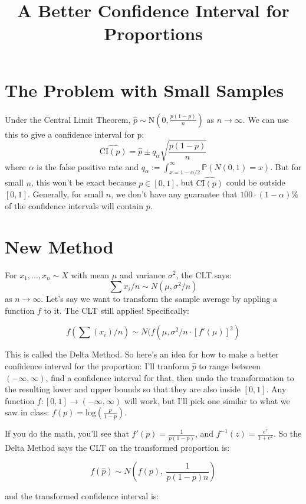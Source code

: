 \documentclass{article}
\title{A Better Confidence Interval for Proportions}
\author{}
\date{}
\begin{document}
\maketitle 

\section*{The Problem with Small Samples}

Under the Central Limit Theorem, $\hat{p} \sim \text{N}(0, \frac{p(1-p)}{n})$ as $n\rightarrow\infty$. We can use this to give a confidence interval for p: $$\widehat{\text{CI}(p)}=\hat{p} \pm q_\alpha\sqrt{\frac{p(1-p)}{n}}$$ where $\alpha$ is the false positive rate and $q_\alpha:=\int_{x=1-\alpha/2}^\infty \mathbb{P}(N(0, 1) = x)$. But for small $n$, this won't be exact because $p\in [0, 1]$, but $\widehat{\text{CI}(p)}$ could be outside $[0, 1]$. Generally, for small $n$, we don't have any guarantee that $100\cdot(1-\alpha)\%$ of the confidence intervals will contain $p$.

\section*{New Method}

For $x_1, ..., x_n \sim X$ with mean $\mu$ and variance $\sigma^2$, the CLT says: $$\sum x_i/n \sim N(\mu, \sigma^2/n)$$ as $n\rightarrow \infty$. Let's say we want to transform the sample average by appling a function $f$ to it. The CLT still applies! Specifically:

$$f(\sum (x_i)/n) \sim N(f(\mu,\sigma^2/n\cdot \left[f'(\mu)\right]^2)$$

This is called the Delta Method. So here's an idea for how to make a better confidence interval for the proportion: I'll tranform $\hat{p}$ to range between $(-\infty, \infty)$, find a confidence interval for that, then undo the transformation to the resulting lower and upper bounds so that they are also inside $[0, 1]$. Any function $f: [0, 1] \rightarrow (-\infty, \infty)$ will work, but I'll pick one similar to what we saw in class: $f(p)=\text{log}(\frac{p}{1-p})$.

\newpage
If you do the math, you'll see that $f'(p) = \frac{1}{p(1-p)}$, and $f^{-1}(z) = \frac{e^z}{1+e^z}$. So the Delta Method says the CLT on the transformed proportion is:

$$f(\hat{p}) \sim N\left(f(p),\ \frac{1}{p(1-p)n}\right)$$

and the transformed confidence interval is:
\end{document}
